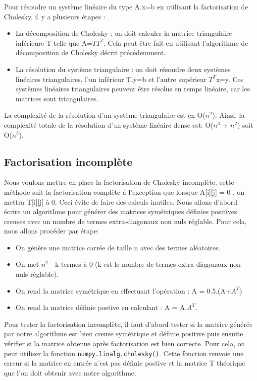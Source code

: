 \documentclass{article}
\begin{document}
Pour résoudre un système linéaire du type A.x=b en utilisant la factorisation de Cholesky, il y a plusieurs étapes : 
\begin{itemize}
    \item La décomposition de Cholesky : on doit calculer la matrice triangulaire inférieure T telle que A=$TT^{T}$. Cela peut être fait en utilisant l'algorithme de décomposition de Cholesky décrit précédemment.
    \item La résolution du système triangulaire : on doit résoudre deux systèmes linéaires triangulaires, l'un inférieur T.y=b et l'autre supérieur $T^{T}$x=y. Ces systèmes linéaires triangulaires peuvent être résolus en temps linéaire, car les matrices sont triangulaires. 
\end{itemize}
La complexité de la résolution d'un système triangulaire est en O($n^2$). Ainsi, la complexité totale de la résolution d'un système linéaire dense est: O($n^3$ + $n^2$) soit O($n^3$). 

\subsection{Factorisation incomplète}
\label{ssec:factor_incompl}
Nous voulons mettre en place la factorisation de Cholesky incomplète, cette méthode suit la factorisation complète à l'exception que lorsque A[i][j] = 0 , on mettra T[i][j] à 0. Ceci évite de faire des calculs inutiles. 
Nous allons d'abord écrire un algorithme pour générer des matrices symétriques définies positives creuses avec un nombre de termes extra-diagonaux non nuls réglable. Pour cela, nous allons procéder par étape:
\begin{itemize}
    \item On génère une matrice carrée de taille n avec des termes aléatoires.
    \item On met $n^2$ - k termes à 0 (k est le nombre de termes extra-diagonaux non nuls réglable).
    \item On rend la matrice symétrique en effectuant l'opération : A = 0.5.(A+$A^{T}$)
    \item On rend la matrice définie postive en calculant : A = A.$A^{T}$.

\end{itemize}

Pour tester la factorisation incomplète, il faut d'abord tester si la matrice générée par notre algorithme est bien creuse symétrique et définie positive puis ensuite vérifier si la matrice obtenue après factorisation est bien correcte. 
Pour cela, on peut utiliser la fonction \verb|numpy.linalg.cholesky()|. Cette fonction renvoie une erreur si la matrice en entrée n'est pas définie postive et la matrice T théorique que l'on doit obtenir avec notre algorithme.
\end{document}
